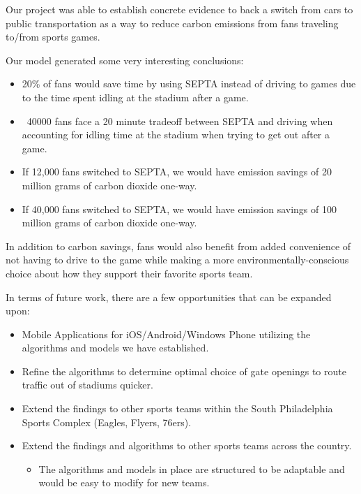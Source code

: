Our project was able to establish concrete evidence to back a switch from cars
to public transportation as a way to reduce carbon emissions from fans traveling
to/from sports games.

Our model generated some very interesting conclusions:
\begin{itemize}
\item 20\% of fans would save time by using SEPTA instead of driving to games due to the time spent idling at the stadium after a game.
\item ~40000 fans face a 20 minute tradeoff between SEPTA and driving when accounting for idling time at the stadium when trying to get out after a game.
\item If 12,000 fans switched to SEPTA, we would have emission savings of 20 million grams of carbon dioxide one-way.
\item If 40,000 fans switched to SEPTA, we would have emission savings of 100 million grams of carbon dioxide one-way.
\end{itemize}

In addition to carbon savings, fans would also benefit from added convenience of not having to drive to the game while making a more environmentally-conscious choice about how they support their favorite sports team.

In terms of future work, there are a few opportunities that can be expanded upon:
\begin{itemize}
\item Mobile Applications for iOS/Android/Windows Phone utilizing the algorithms and models we have established.
\item Refine the algorithms to determine optimal choice of gate openings to route traffic out of stadiums quicker.
\item Extend the findings to other sports teams within the South Philadelphia Sports Complex (Eagles, Flyers, 76ers).
\item Extend the findings and algorithms to other sports teams across the country.
\begin{itemize}
\item The algorithms and models in place are structured to be adaptable and would be easy to modify for new teams.
\end{itemize}
\end{itemize}
